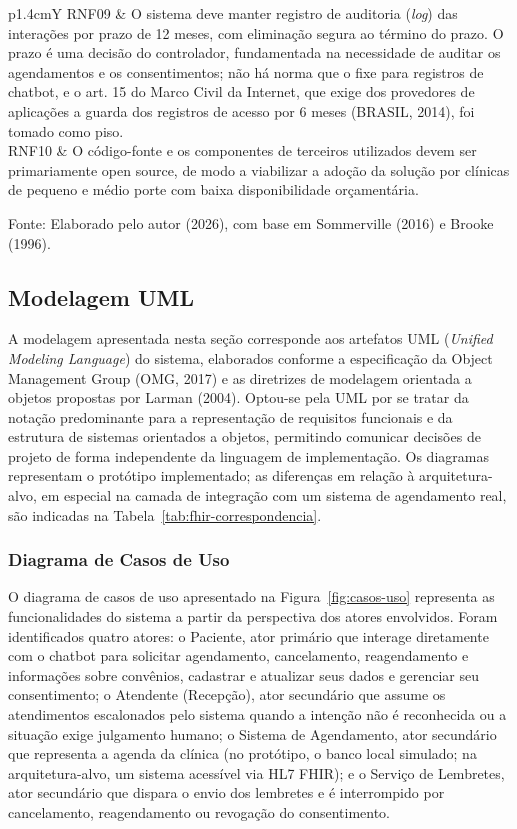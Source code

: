 \documentclass[12pt,a4paper]{extarticle}
\begin{document}
\begin{xltabular}{\textwidth}{p{1.4cm}Y}
RNF09 & O sistema deve manter registro de auditoria (\textit{log}) das interações por prazo de 12 meses, com eliminação segura ao término do prazo. O prazo é uma decisão do controlador, fundamentada na necessidade de auditar os agendamentos e os consentimentos; não há norma que o fixe para registros de chatbot, e o art. 15 do Marco Civil da Internet, que exige dos provedores de aplicações a guarda dos registros de acesso por 6 meses (BRASIL, 2014), foi tomado como piso. \\
RNF10 & O código-fonte e os componentes de terceiros utilizados devem ser primariamente open source, de modo a viabilizar a adoção da solução por clínicas de pequeno e médio porte com baixa disponibilidade orçamentária. \\
\end{xltabular}
\vspace{0.3cm}

\footnotesize{Fonte: Elaborado pelo autor (2026), com base em Sommerville (2016) e Brooke (1996).}


\subsection{Modelagem UML}

A modelagem apresentada nesta seção corresponde aos artefatos UML (\textit{Unified Modeling Language}) do sistema, elaborados conforme a especificação da Object Management Group (OMG, 2017) e as diretrizes de modelagem orientada a objetos propostas por Larman (2004). Optou-se pela UML por se tratar da notação predominante para a representação de requisitos funcionais e da estrutura de sistemas orientados a objetos, permitindo comunicar decisões de projeto de forma independente da linguagem de implementação. Os diagramas representam o protótipo implementado; as diferenças em relação à arquitetura-alvo, em especial na camada de integração com um sistema de agendamento real, são indicadas na Tabela~\ref{tab:fhir-correspondencia}.

\subsubsection{Diagrama de Casos de Uso}

O diagrama de casos de uso apresentado na Figura~\ref{fig:casos-uso} representa as funcionalidades do sistema a partir da perspectiva dos atores envolvidos. Foram identificados quatro atores: o Paciente, ator primário que interage diretamente com o chatbot para solicitar agendamento, cancelamento, reagendamento e informações sobre convênios, cadastrar e atualizar seus dados e gerenciar seu consentimento; o Atendente (Recepção), ator secundário que assume os atendimentos escalonados pelo sistema quando a intenção não é reconhecida ou a situação exige julgamento humano; o Sistema de Agendamento, ator secundário que representa a agenda da clínica (no protótipo, o banco local simulado; na arquitetura-alvo, um sistema acessível via HL7 FHIR); e o Serviço de Lembretes, ator secundário que dispara o envio dos lembretes e é interrompido por cancelamento, reagendamento ou revogação do consentimento.
\end{document}
